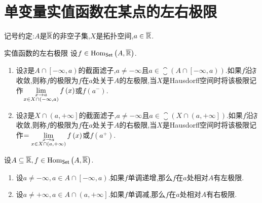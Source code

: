 \section{单变量实值函数在某点的左右极限}

记号约定:$A$是$\overline{\mathbb{R}}$的非空子集,$X$是拓扑空间,$a\in\overline{\mathbb{R}}$.

\begin{definition}{实值函数的左右极限}{}
	设$f\in\operatorname{Hom}_{\mathsf{Set}}\left(A,\overline{\mathbb{R}}\right)$.
	\begin{enumerate}
		\item 设$\mathfrak{F}$是$A\cap\left[-\infty,a\right)$的截面滤子,$a\neq -\infty$且$a\in\closure\left(A\cap\left[-\infty,a\right)\right)$.如果$f$沿$\mathfrak{F}$收敛,则称$f$的极限为$f$在$a$处关于$A$的左极限,当$X$是Hausdorff空间时将该极限记作$\displaystyle\lim_{\substack{x\to a\\x\in X\cap\left(-\infty,a\right)}}f\left(x\right)$或$f\left(a^{-}\right)$.
		\item 设$\mathfrak{F}$是$X\cap\left(a,+\infty\right]$的截面滤子,$a\neq -\infty$且$a\in\closure\left(X\cap\left(a,+\infty\right]\right)$.如果$f$沿$\mathfrak{F}$收敛,则称$f$的极限为$f$在$a$处关于$A$的右极限,当$X$是Hausdorff空间时将该极限记作$=\displaystyle\lim_{\substack{x\to a\\x\in X\cap\left(a,+\infty\right)}}f\left(x\right)$或$f\left(a^{+}\right)$.
	\end{enumerate}
\end{definition}

\begin{proposition}{}{}
	设$A\subseteq\overline{\mathbb{R}},f\in\operatorname{Hom}_{\mathsf{Set}}\left(A,\overline{\mathbb{R}}\right)$.
	\begin{enumerate}
		\item 设$a\neq -\infty,a\in A\cap\left[-\infty,a\right)$.如果$f$单调递增,那么$f$在$a$处相对$A$有左极限.
		\item 设$a\neq +\infty,a\in A\cap\left(a,+\infty\right]$.如果$f$单调减,那么$f$在$a$处相对$A$有右极限.
	\end{enumerate}
\end{proposition}

